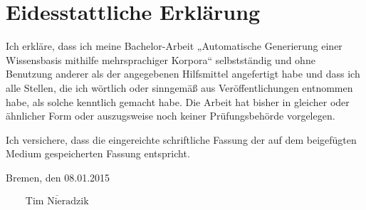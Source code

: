 \newpage
\thispagestyle{empty} %
\section*{Eidesstattliche Erklärung}
Ich erkläre, dass ich meine Bachelor-Arbeit „Automatische Generierung einer Wissensbasis mithilfe mehrsprachiger Korpora“ selbstständig und ohne Benutzung anderer als der angegebenen Hilfsmittel angefertigt habe und dass ich alle Stellen, die ich wörtlich oder sinngemäß aus Veröffentlichungen entnommen habe, als solche kenntlich gemacht habe. Die Arbeit hat bisher in gleicher oder ähnlicher Form oder auszugsweise noch keiner Prüfungsbehörde vorgelegen.

Ich versichere, dass die eingereichte schriftliche Fassung der auf dem beigefügten Medium gespeicherten Fassung entspricht.

\vspace{1cm}

\noindent Bremen, den 08.01.2015

\begin{flushright}
$\overline{~~~~~~~~~\mbox{Tim Nieradzik}~~~~~~~~~}$
\end{flushright}
